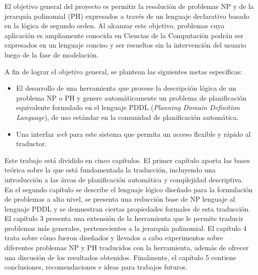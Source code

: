El objetivo general del proyecto es permitir la resolución de problemas
NP y de la jerarquía polinomial (PH) expresados a través de un lenguaje declarativo basado en 
la lógica de segundo orden.
Al alcanzar este objetivo, problemas cuya aplicación es
ampliamente conocida en Ciencias de la Computación podrán ser expresados
en un lenguaje conciso y ser resueltos sin la intervención del usuario luego de
la fase de modelación.

A fin de lograr el objetivo general, se plantean las siguientes metas
específicas:
\begin{itemize}
\item El desarrollo de una herramienta que procese la descripción lógica de un problema 
NP o PH y genere automáticamente un problema de planificación equivalente 
formulado en el lenguaje PDDL (\textit{Planning Domain Definition Language}),
de uso estándar en la comunidad de planificación automática.
\item Una interfaz \textit{web} para este sistema que permita un acceso flexible
y rápido al traductor.
\end{itemize}

Este trabajo está dividido en cinco capítulos. El primer capítulo aporta las
bases teórica sobre la que está fundamentada la traducción, incluyendo una
introducción a las áreas de planificación automática y complejidad descriptiva.
En el segundo capítulo se describe el lenguaje lógico diseñado para la
formulación de problemas a alto nivel, se presenta una reducción base de NP
lenguaje al lenguaje PDDL y se demuestran ciertas propiedades formales de esta
traducción. 
El capítulo 3 presenta una extensión de la herramienta que
le permite traducir problemas más generales, pertenecientes a la jerarquía
polinomial.
El capítulo 4 trata sobre cómo fueron diseñados y llevados a
cabo experimentos sobre diferentes problemas NP y PH traducidos con la herramienta,
además de ofrecer una discusión de los resultados obtenidos. Finalmente, el
capítulo 5 contiene conclusiones, recomendaciones e ideas para trabajos
futuros.

